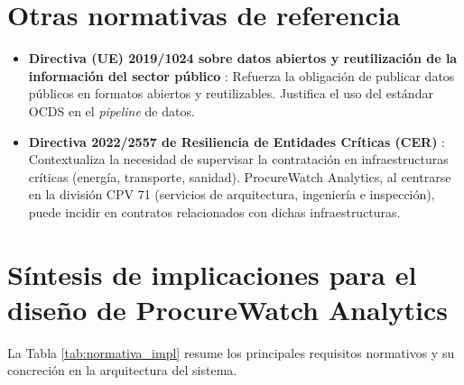 \documentclass[11pt,a4paper,spanish]{book}
\numberwithin{equation}{chapter}
\numberwithin{figure}{chapter}
\begin{document}
\section{Otras normativas de referencia}

\begin{itemize}
\item \textbf{Directiva (UE) 2019/1024 sobre datos abiertos y reutilización de la información del sector público} \cite{OpenDataDirective2019}: Refuerza la obligación de publicar datos públicos en formatos abiertos y reutilizables. Justifica el uso del estándar OCDS en el \textit{pipeline} de datos.

\item \textbf{Directiva 2022/2557 de Resiliencia de Entidades Críticas (CER)} \cite{CERDirective2022}: Contextualiza la necesidad de supervisar la contratación en infraestructuras críticas (energía, transporte, sanidad). ProcureWatch Analytics, al centrarse en la división CPV 71 (servicios de arquitectura, ingeniería e inspección), puede incidir en contratos relacionados con dichas infraestructuras.
\end{itemize}

\section{Síntesis de implicaciones para el diseño de ProcureWatch Analytics}

La Tabla \ref{tab:normativa_impl} resume los principales requisitos normativos y su concreción en la arquitectura del sistema.
\end{document}
